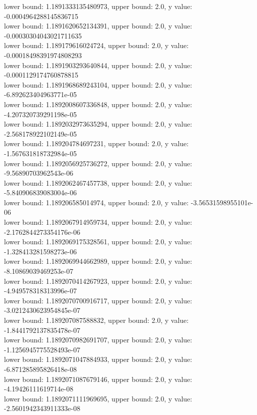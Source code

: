 \documentclass[12pt]{article}
\begin{document}
\begin{enumerate}
\begin{footnotesize}
\begin{spacing}{-.8}
lower bound: 1.1891333135480973, upper bound: 2.0, y value: -0.0004964288145836715\\
lower bound: 1.1891620652134391, upper bound: 2.0, y value: -0.00030304043021711635\\
lower bound: 1.189179616024724, upper bound: 2.0, y value: -0.00018498391974808293\\
lower bound: 1.1891903293640844, upper bound: 2.0, y value: -0.0001129174760878815\\
lower bound: 1.1891968689243104, upper bound: 2.0, y value: -6.892623404963771e-05\\
lower bound: 1.1892008607336848, upper bound: 2.0, y value: -4.207320739291198e-05\\
lower bound: 1.1892032973635294, upper bound: 2.0, y value: -2.568178922102149e-05\\
lower bound: 1.189204784697231, upper bound: 2.0, y value: -1.567631818732984e-05\\
lower bound: 1.1892056925736272, upper bound: 2.0, y value: -9.56890703962543e-06\\
lower bound: 1.1892062467457738, upper bound: 2.0, y value: -5.840906839083004e-06\\
lower bound: 1.189206585014974, upper bound: 2.0, y value: -3.56531598955101e-06\\
lower bound: 1.1892067914959734, upper bound: 2.0, y value: -2.1762844273354176e-06\\
lower bound: 1.1892069175328561, upper bound: 2.0, y value: -1.328413281598273e-06\\
lower bound: 1.1892069944662989, upper bound: 2.0, y value: -8.10869039469253e-07\\
lower bound: 1.1892070414267923, upper bound: 2.0, y value: -4.949578318313996e-07\\
lower bound: 1.1892070700916717, upper bound: 2.0, y value: -3.0212430623954845e-07\\
lower bound: 1.189207087588832, upper bound: 2.0, y value: -1.8441792137835478e-07\\
lower bound: 1.1892070982691707, upper bound: 2.0, y value: -1.1256945775528493e-07\\
lower bound: 1.1892071047884933, upper bound: 2.0, y value: -6.871285895826418e-08\\
lower bound: 1.1892071087679146, upper bound: 2.0, y value: -4.19426111619714e-08\\
lower bound: 1.1892071111969695, upper bound: 2.0, y value: -2.5601942343911333e-08\\

\end{spacing}
\end{footnotesize}
\end{enumerate}
\end{document}

